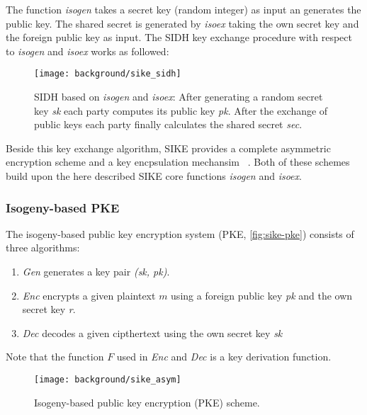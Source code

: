 The function \textit{isogen} takes a secret key (random integer) as input an generates the public key. The shared secret is generated by \textit{isoex} taking the own secret key and the foreign public key as input. The SIDH key exchange procedure with respect to \textit{isogen} and \textit{isoex} works as followed:


\begin{figure}[H]
  \centering
  \texttt{[image: background/sike\_sidh]}
  \caption[SIDH based on \textit{isogen} and \textit{isoex}]{SIDH based on \textit{isogen} and \textit{isoex}: After generating a random secret key \textit{sk} each party computes its public key \textit{pk}. After the exchange of public keys each party finally calculates the shared secret \textit{sec}.} \label{fig:sike-sidh}
\end{figure}
Beside this key exchange algorithm, SIKE provides a complete asymmetric encryption scheme  and a key encpsulation mechansim  ~\parencite{sike2020spec}. Both of these schemes build upon the here described SIKE core functions \textit{isogen} and \textit{isoex}.

\subsubsection{Isogeny-based PKE}
The isogeny-based public key encryption system (PKE, \autoref{fig:sike-pke}) consists of three algorithms:
\begin{enumerate}
\item \textit{Gen} generates a key pair \textit{(sk, pk)}.
\item \textit{Enc} encrypts a given plaintext $m$ using a foreign public key \textit{pk} and the own secret key \textit{r}.
\item \textit{Dec} decodes a given cipthertext using the own secret key \textit{sk}
\end{enumerate}
Note that the function $F$ used in \textit{Enc} and \textit{Dec} is a key derivation function.

\begin{figure}[H]
  \centering
  \texttt{[image: background/sike\_asym]}
  \caption[Isogeny-based PKE]
  {Isogeny-based public key encryption (PKE) scheme.} \label{fig:sike-pke}
\end{figure}

